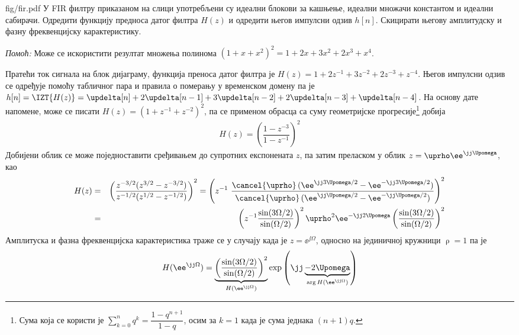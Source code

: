 
\begin{slikaDesno}{fig/fir.pdf}
    \PID У FIR филтру приказаном на слици употребљени су идеални блокови за кашњење, идеални множачи константом и идеални сабирачи.
    Одредити функцију предноса датог филтра $H(z)$ и одредити његов импулсни одзив $h[n]$.
    Скицирати његову амплитудску и фазну фреквенцијску карактеристику.        
\end{slikaDesno}
\textit{Помоћ:} Може се искористити резултат множења полинома $(1 + x + x^2)^2 = 1 + 2x + 3x^2 + 2x^3 + x^4$. 

\RESENJE
Пратећи ток сигнала на блок дијаграму, функција преноса датог филтра је 
$H(z) = 1 + 2 z^{-1} + 3 z^{-2} +  2 z^{-3} + z^{-4}$. Његов импулсни одзив се одређује помоћу 
табличног пара  и правила о померању у временском домену па је 
$h[n] = \IZT{H(z)} = \updelta[n] + 2 \updelta[n-1] + 3\updelta[n-2] + 2\updelta[n-3] + \updelta[n-4]$. 
На основу дате напомене, може се писати $H(z) = (1 + z^{-1} + z^{-2})^2$, па се применом обрасца са суму 
геометријске прогресије\footnote{Сума која се користи је 
$\sum_{k = 0}^n q^k = \dfrac{1 - q^{n+1}}{1 - q}$, осим за  $k = 1$ када је сума једнака $(n+1)q$.
} добија 
\begin{eqnarray}
    H(z) = \left( \dfrac{1 - z^{-3}}{1 - z^{-1}} \right)^2 
\end{eqnarray}
Добијени облик се може поједноставити сређивањем до супротних експонената $z$, па затим преласком 
у облик $z = \uprho \ee^{\jj\Upomega}$, као
\begin{eqnarray}
    H(z) &=& 
    \left( \dfrac{ z^{-3/2} (z^{3/2} - z^{-3/2}) }{ z^{-1/2} (z^{1/2} - z^{-1/2})  } \right)^2
    =
    \left( z^{-1} \,\, \dfrac{ \cancel{\uprho} \, ( \ee^{\jj3\Upomega/2} - \ee^{-\jj3\Upomega/2} ) }{\cancel{\uprho}\,( \ee^{\jj\Upomega/2} - \ee^{-\jj\Upomega/2} )} \right)^2
    \\
    &=&
    \left(
        z^{-1}
        \dfrac{\sin(3\Omega/2)}{\sin(\Omega/2)}
    \right)^2
    \uprho^2 \ee^{-\jj 2\Upomega} 
    \left(
        \dfrac{\sin(3\Omega/2)}{\sin(\Omega/2)}
    \right)^2
\end{eqnarray}
Амплитуска и фазна фреквенцијска карактеристика траже се у случају када је $z = \ee^{\jj\Omega}$, односно на јединичној
кружници $\uprho = 1$ па је 
\begin{eqnarray}
    H(\ee^{\jj\Omega}) = 
    \underbrace{
    \left(
        \dfrac{\sin(3\Omega/2)}{\sin(\Omega/2)}
    \right)^2
    }_{H(\ee^{\jj\Omega})}
    \exp\left(\jj 
    \underbrace{-2\Upomega}_{
        \arg H(\ee^{\jj\Omega})
    } \right)
\end{eqnarray}

